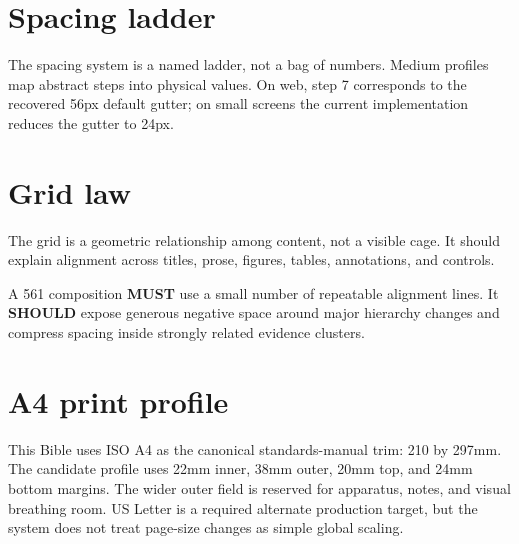 \documentclass[11pt,twoside,openany]{report}
\newcommand{\MUST}{\textbf{MUST}\xspace}
\newcommand{\SHOULD}{\textbf{SHOULD}\xspace}
\begin{document}
\section{Spacing ladder}
The spacing system is a named ladder, not a bag of numbers. Medium profiles map abstract steps into physical values. On web, step 7 corresponds to the recovered 56px default gutter; on small screens the current implementation reduces the gutter to 24px.


\section{Grid law}
The grid is a geometric relationship among content, not a visible cage. It should explain alignment across titles, prose, figures, tables, annotations, and controls.

\begin{specbox}
A 561 composition \MUST use a small number of repeatable alignment lines. It \SHOULD expose generous negative space around major hierarchy changes and compress spacing inside strongly related evidence clusters.
\end{specbox}

\section{A4 print profile}
This Bible uses ISO A4 as the canonical standards-manual trim: 210 by 297mm. The candidate profile uses 22mm inner, 38mm outer, 20mm top, and 24mm bottom margins. The wider outer field is reserved for apparatus, notes, and visual breathing room. US Letter is a required alternate production target, but the system does not treat page-size changes as simple global scaling.

\end{document}
